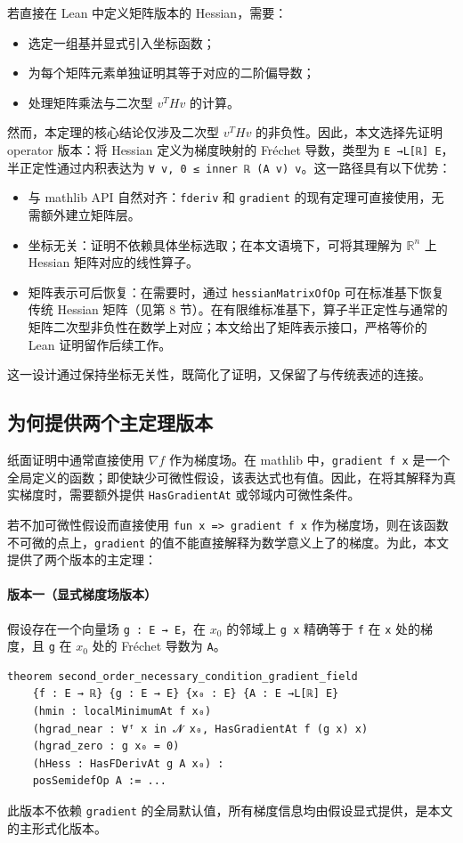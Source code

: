 ﻿\documentclass[UTF8,a4paper,zihao=-4]{ctexart}
\begin{document}
若直接在 Lean 中定义矩阵版本的 Hessian，需要：
\begin{itemize}
\item 选定一组基并显式引入坐标函数；
\item 为每个矩阵元素单独证明其等于对应的二阶偏导数；
\item 处理矩阵乘法与二次型 \(v^T H v\) 的计算。
\end{itemize}
然而，本定理的核心结论仅涉及二次型 \(v^T H v\) 的非负性。因此，本文选择先证明 operator 版本：将 Hessian 定义为梯度映射的 Fréchet 导数，类型为 \texttt{E →L[ℝ] E}，半正定性通过内积表达为 \texttt{∀ v, 0 ≤ inner ℝ (A v) v}。这一路径具有以下优势：
\begin{itemize}
\item 与 mathlib API 自然对齐：\texttt{fderiv} 和 \texttt{gradient} 的现有定理可直接使用，无需额外建立矩阵层。
\item 坐标无关：证明不依赖具体坐标选取；在本文语境下，可将其理解为 \(\mathbb{R}^n\) 上 Hessian 矩阵对应的线性算子。
\item 矩阵表示可后恢复：在需要时，通过 \texttt{hessianMatrixOfOp} 可在标准基下恢复传统 Hessian 矩阵（见第 8 节）。在有限维标准基下，算子半正定性与通常的矩阵二次型非负性在数学上对应；本文给出了矩阵表示接口，严格等价的 Lean 证明留作后续工作。
\end{itemize}
这一设计通过保持坐标无关性，既简化了证明，又保留了与传统表述的连接。

\subsection{为何提供两个主定理版本}
纸面证明中通常直接使用 \(\nabla f\) 作为梯度场。在 mathlib 中，\texttt{gradient f x} 是一个全局定义的函数；即使缺少可微性假设，该表达式也有值。因此，在将其解释为真实梯度时，需要额外提供 \texttt{HasGradientAt} 或邻域内可微性条件。

若不加可微性假设而直接使用 \texttt{fun x => gradient f x} 作为梯度场，则在该函数不可微的点上，\texttt{gradient} 的值不能直接解释为数学意义上了的梯度。为此，本文提供了两个版本的主定理：

\paragraph{版本一（显式梯度场版本）}假设存在一个向量场 \texttt{g : E → E}，在 \(x_0\) 的邻域上 \texttt{g x} 精确等于 \texttt{f} 在 \texttt{x} 处的梯度，且 \texttt{g} 在 \(x_0\) 处的 Fréchet 导数为 \texttt{A}。
\begin{verbatim}
theorem second_order_necessary_condition_gradient_field
    {f : E → ℝ} {g : E → E} {x₀ : E} {A : E →L[ℝ] E}
    (hmin : localMinimumAt f x₀)
    (hgrad_near : ∀ᶠ x in 𝓝 x₀, HasGradientAt f (g x) x)
    (hgrad_zero : g x₀ = 0)
    (hHess : HasFDerivAt g A x₀) :
    posSemidefOp A := ...
\end{verbatim}
此版本不依赖 \texttt{gradient} 的全局默认值，所有梯度信息均由假设显式提供，是本文的主形式化版本。
\end{document}

